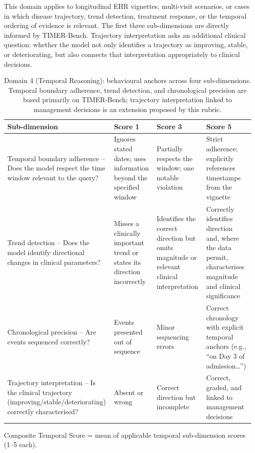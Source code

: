 \documentclass{article}
\begin{document}
This domain applies to longitudinal EHR vignettes, multi-visit scenarios, or cases in which disease trajectory, trend detection, treatment response, or the temporal ordering of evidence is relevant. The first three sub-dimensions are directly informed by TIMER-Bench. Trajectory interpretation asks an additional clinical question: whether the model not only identifies a trajectory as improving, stable, or deteriorating, but also connects that interpretation appropriately to clinical decisions.

\begin{table}[H]
\centering
\scriptsize
\begin{tabularx}{\textwidth}{Y Y Y Y}
\toprule
\textbf{Sub-dimension} & \textbf{Score 1} & \textbf{Score 3} & \textbf{Score 5} \\
\midrule
Temporal boundary adherence -- Does the model respect the time window relevant to the query? & Ignores stated dates; uses information beyond the specified window & Partially respects the window; one notable violation & Strict adherence; explicitly references timestamps from the vignette \cite{cui2025timer} \\
\addlinespace
Trend detection -- Does the model identify directional changes in clinical parameters? & Misses a clinically important trend or states its direction incorrectly & Identifies the correct direction but omits magnitude or relevant clinical interpretation & Correctly identifies direction and, where the data permit, characterises magnitude and clinical significance \cite{cui2025timer} \\
\addlinespace
Chronological precision -- Are events sequenced correctly? & Events presented out of sequence & Minor sequencing errors & Correct chronology with explicit temporal anchors (e.g., ``on Day 3 of admission\ldots'') \cite{cui2025timer} \\
\addlinespace
Trajectory interpretation -- Is the clinical trajectory (improving/stable/deteriorating) correctly characterised? & Absent or wrong & Correct direction but incomplete & Correct, graded, and linked to management decisions \\
\bottomrule
\end{tabularx}
\caption{Domain 4 (Temporal Reasoning): behavioural anchors across four sub-dimensions. Temporal boundary adherence, trend detection, and chronological precision are based primarily on TIMER-Bench; trajectory interpretation linked to management decisions is an extension proposed by this rubric.}
\end{table}
Composite Temporal Score = mean of applicable temporal sub-dimension scores (1--5 each).
\end{document}
